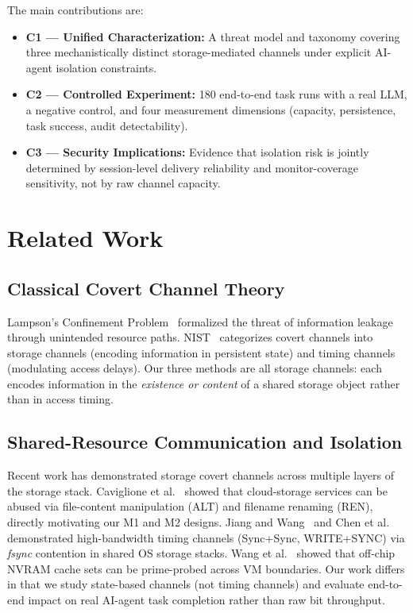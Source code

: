 \documentclass[conference]{IEEEtran}
\begin{document}
The main contributions are:
\begin{itemize}
    \item \textbf{C1 --- Unified Characterization:} A threat model and taxonomy covering three mechanistically distinct storage-mediated channels under explicit AI-agent isolation constraints.
    \item \textbf{C2 --- Controlled Experiment:} 180 end-to-end task runs with a real LLM, a negative control, and four measurement dimensions (capacity, persistence, task success, audit detectability).
    \item \textbf{C3 --- Security Implications:} Evidence that isolation risk is jointly determined by session-level delivery reliability and monitor-coverage sensitivity, not by raw channel capacity.
\end{itemize}

\section{Related Work}

\subsection{Classical Covert Channel Theory}
Lampson's Confinement Problem~\cite{lampson1973confinement} formalized the threat of information leakage through unintended resource paths. NIST~\cite{nist2007guide} categorizes covert channels into storage channels (encoding information in persistent state) and timing channels (modulating access delays). Our three methods are all storage channels: each encodes information in the \emph{existence or content} of a shared storage object rather than in access timing.

\subsection{Shared-Resource Communication and Isolation}
Recent work has demonstrated storage covert channels across multiple layers of the storage stack. Caviglione et al.~\cite{caviglione2016dropbox} showed that cloud-storage services can be abused via file-content manipulation (ALT) and filename renaming (REN), directly motivating our M1 and M2 designs. Jiang and Wang~\cite{jiang2024sync} and Chen et al.~\cite{chen2024write} demonstrated high-bandwidth timing channels (Sync+Sync, WRITE+SYNC) via \textit{fsync} contention in shared OS storage stacks. Wang et al.~\cite{wang2023nvleak} showed that off-chip NVRAM cache sets can be prime-probed across VM boundaries. Our work differs in that we study state-based channels (not timing channels) and evaluate end-to-end impact on real AI-agent task completion rather than raw bit throughput.
\end{document}
